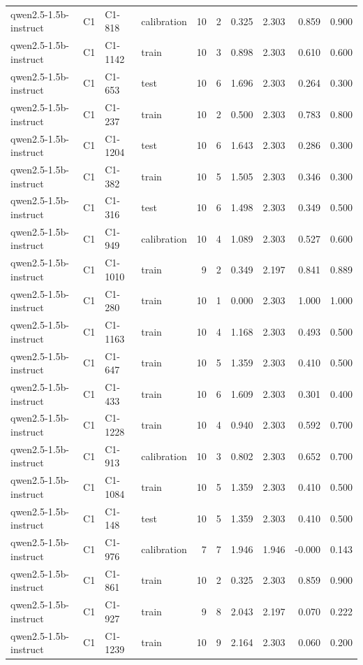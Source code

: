 \begin{table}
\begin{tabular}{llllrrrrrr}
qwen2.5-1.5b-instruct & C1 & C1-818 & calibration & 10 & 2 & 0.325 & 2.303 & 0.859 & 0.900 \\
qwen2.5-1.5b-instruct & C1 & C1-1142 & train & 10 & 3 & 0.898 & 2.303 & 0.610 & 0.600 \\
qwen2.5-1.5b-instruct & C1 & C1-653 & test & 10 & 6 & 1.696 & 2.303 & 0.264 & 0.300 \\
qwen2.5-1.5b-instruct & C1 & C1-237 & train & 10 & 2 & 0.500 & 2.303 & 0.783 & 0.800 \\
qwen2.5-1.5b-instruct & C1 & C1-1204 & test & 10 & 6 & 1.643 & 2.303 & 0.286 & 0.300 \\
qwen2.5-1.5b-instruct & C1 & C1-382 & train & 10 & 5 & 1.505 & 2.303 & 0.346 & 0.300 \\
qwen2.5-1.5b-instruct & C1 & C1-316 & test & 10 & 6 & 1.498 & 2.303 & 0.349 & 0.500 \\
qwen2.5-1.5b-instruct & C1 & C1-949 & calibration & 10 & 4 & 1.089 & 2.303 & 0.527 & 0.600 \\
qwen2.5-1.5b-instruct & C1 & C1-1010 & train & 9 & 2 & 0.349 & 2.197 & 0.841 & 0.889 \\
qwen2.5-1.5b-instruct & C1 & C1-280 & train & 10 & 1 & 0.000 & 2.303 & 1.000 & 1.000 \\
qwen2.5-1.5b-instruct & C1 & C1-1163 & train & 10 & 4 & 1.168 & 2.303 & 0.493 & 0.500 \\
qwen2.5-1.5b-instruct & C1 & C1-647 & train & 10 & 5 & 1.359 & 2.303 & 0.410 & 0.500 \\
qwen2.5-1.5b-instruct & C1 & C1-433 & train & 10 & 6 & 1.609 & 2.303 & 0.301 & 0.400 \\
qwen2.5-1.5b-instruct & C1 & C1-1228 & train & 10 & 4 & 0.940 & 2.303 & 0.592 & 0.700 \\
qwen2.5-1.5b-instruct & C1 & C1-913 & calibration & 10 & 3 & 0.802 & 2.303 & 0.652 & 0.700 \\
qwen2.5-1.5b-instruct & C1 & C1-1084 & train & 10 & 5 & 1.359 & 2.303 & 0.410 & 0.500 \\
qwen2.5-1.5b-instruct & C1 & C1-148 & test & 10 & 5 & 1.359 & 2.303 & 0.410 & 0.500 \\
qwen2.5-1.5b-instruct & C1 & C1-976 & calibration & 7 & 7 & 1.946 & 1.946 & -0.000 & 0.143 \\
qwen2.5-1.5b-instruct & C1 & C1-861 & train & 10 & 2 & 0.325 & 2.303 & 0.859 & 0.900 \\
qwen2.5-1.5b-instruct & C1 & C1-927 & train & 9 & 8 & 2.043 & 2.197 & 0.070 & 0.222 \\
qwen2.5-1.5b-instruct & C1 & C1-1239 & train & 10 & 9 & 2.164 & 2.303 & 0.060 & 0.200 \\

\end{tabular}
\end{table}
